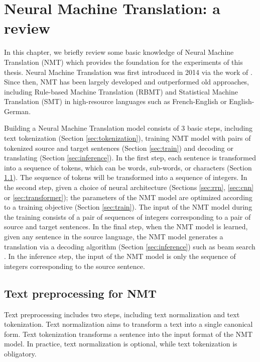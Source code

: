 \chapter{Neural Machine Translation: a review}
\label{chap:nmt-review}
In this chapter, we briefly review some basic knowledge of Neural Machine Translation (NMT) which provides the foundation for the experiments of this thesis. Neural Machine Translation was first introduced in 2014 via the work of \citet{Cho14properties,Bahdanau15learning}. Since then, NMT has been largely developed and outperformed old approaches, including Rule-based Machine Translation (RBMT) and Statistical Machine Translation (SMT) in high-resource languages such as French-English or English-German.

Building a Neural Machine Translation model consists of 3 basic steps, including text tokenization (Section \ref{sec:tokenization}), training NMT model with pairs of tokenized source and target sentences (Section \ref{sec:train}) and decoding or translating (Section \ref{sec:inference}). In the first step, each sentence is transformed into a sequence of tokens, which can be words, sub-words, or characters (Section \ref{sec:preprocessing}). The sequence of tokens will be transformed into a sequence of integers. In the second step, given a choice of neural architecture (Sections \ref{sec:rrn}, \ref{sec:cnn} or \ref{sec:transformer}); the parameters of the NMT model are optimized according to a training objective (Section \ref{sec:train}). The input of the NMT model during the training consists of a pair of sequences of integers corresponding to a pair of source and target sentences. In the final step, when the NMT model is learned, given any sentence in the source language, the NMT model generates a translation via a decoding algorithm (Section \ref{sec:inference}) such as beam search \citep{Koehn04pharaoh}. In the inference step, the input of the NMT model is only the sequence of integers corresponding to the source sentence.

\section{Text preprocessing for NMT \label{sec:tokenization}} \label{sec:preprocessing}
Text preprocessing includes two steps, including text normalization and text tokenization. Text normalization aims to transform a text into a single canonical form. Text tokenization transforms a sentence into the input format of the NMT model. In practice, text normalization is optional, while text tokenization is obligatory.

